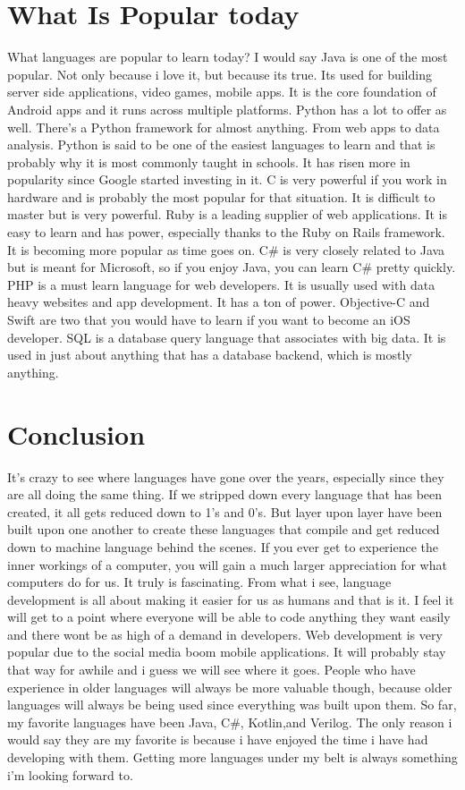\documentclass[letterpaper, 10 pt, conference]{IEEEtran}
\begin{document}
\section{What Is Popular today}
\indent What languages are popular to learn today? I would say Java is one of the most popular. Not only because i love it, but because its true. Its used for building server side applications, video games, mobile apps. It is the core foundation of Android apps and it runs across multiple platforms. Python has a lot to offer as well. There's a Python framework for almost anything. From web apps to data analysis. Python is said to be one of the easiest languages to learn and that is probably why it is most commonly taught in schools. It has risen more in popularity since Google started investing in it. C is very powerful if you work in hardware and is probably the most popular for that situation. It is difficult to master but is very powerful. Ruby is a leading supplier of web applications. It is easy to learn and has power, especially thanks to the Ruby on Rails framework. It is becoming more popular as time goes on. C\# is very closely related to Java but is meant for Microsoft, so if you enjoy Java, you can learn C\# pretty quickly. PHP is a must learn language for web developers. It is usually used with data heavy websites and app development. It has a ton of power. Objective-C and Swift are two that you would have to learn if you want to become an iOS developer. SQL is a database query language that associates with big data. It is used in just about anything that has a database backend, which is mostly anything.~\cite{TheBestToday}

\section{Conclusion}
It's crazy to see where languages have gone over the years, especially since they are all doing the same thing. If we stripped down every language that has been created, it all gets reduced down to 1's and 0's. But layer upon layer have been built upon one another to create these languages that compile and get reduced down to machine language behind the scenes. If you ever get to experience the inner workings of a computer, you will gain a much larger appreciation for what computers do for us. It truly is fascinating. From what i see, language development is all about making it easier for us as humans and that is it. I feel it will get to a point where everyone will be able to code anything they want easily and there wont be as high of a demand in developers. Web development is very popular due to the social media boom mobile applications. It will probably stay that way for awhile and i guess we will see where it goes. People who have experience in older languages will always be more valuable though, because older languages will always be being used since everything was built upon them. So far, my favorite languages have been Java, C\#, Kotlin,and Verilog. The only reason i would say they are my favorite is because i have enjoyed the time i have had developing with them. Getting more languages under my belt is always something i'm looking forward to.

\nocite{*}


\end{document}
